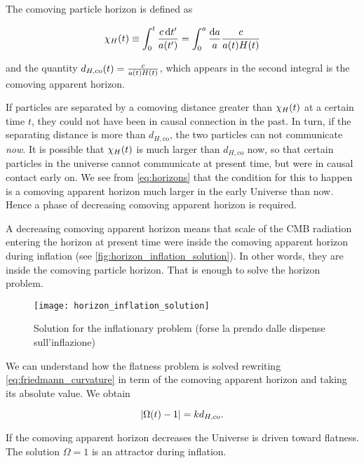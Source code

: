 The comoving particle horizon is defined as

\begin{equation}
        \chi_H\qty(t) \equiv \int^t_0 \frac{c\dd{t'}}{a\qty(t')} =
        \int^a_0 \frac{\dd{a}}{a} \frac{c}{a\qty(t) H\qty(t)}
        \label{eq:horizons}
\end{equation}

and the quantity $d_{H,\text{co}}\qty(t) = \frac{c}{a\qty(t)H\qty(t)}$, which
appears in the second integral is the comoving apparent horizon.

If particles are separated by a comoving distance greater than
$\chi_H\qty(t)$ at a certain time $t$, they could not have been in causal
connection in the past. In turn, if the separating distance is more than
$d_{H,\text{co}}$, the two particles can not communicate \emph{now}. It is
possible that $\chi_H\qty(t)$ is much larger than $d_{H,\text{co}}$ now,
so that certain particles in the universe cannot communicate at present
time, but were in causal contact early on. We see from \autoref{eq:horizons}
that the condition for this to happen is a comoving apparent horizon much larger
in the early Universe than now. Hence a phase of decreasing comoving
apparent horizon is required.

A decreasing comoving apparent horizon means that scale of the CMB
radiation entering the horizon at present time were inside the comoving
apparent horizon during inflation (see \autoref{fig:horizon_inflation_solution}).
In other words, they are inside the comoving particle horizon. That is
enough to solve the horizon problem.

\begin{figure}
        \centering
        \texttt{[image: horizon\_inflation\_solution]}
        \caption{Solution for the inflationary problem (forse la prendo
        dalle dispense sull'inflazione)}
        \label{fig:horizon_inflation_solution}
\end{figure}


We can understand how the flatness problem is solved rewriting
\autoref{eq:friedmann_curvature} in term of the comoving apparent horizon
and taking its absolute value.  We obtain

\begin{equation}
        \abs{\Omega\qty(t) - 1} = k d_{H,\text{co}}.
\end{equation}

If the comoving apparent horizon decreases the Universe is driven toward
flatness. The solution $\Omega = 1$ is an attractor during inflation.

